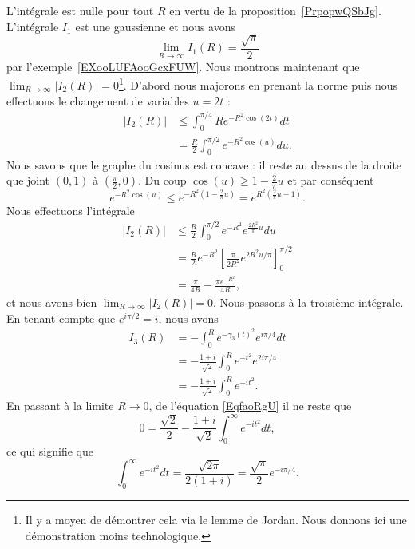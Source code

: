 L'intégrale est nulle pour tout \( R\) en vertu de la proposition~\ref{PrpopwQSbJg}. L'intégrale \( I_1\) est une gaussienne et nous avons
\begin{equation}
	\lim_{R\to\infty}I_1(R)=\frac{ \sqrt{\pi} }{ 2 }
\end{equation}
par l'exemple~\ref{EXooLUFAooGcxFUW}. Nous montrons maintenant que \( \lim_{R\to\infty}| I_2(R) |=0\)\footnote{Il y a moyen de démontrer cela via le lemme de Jordan\cite{FresnelDavidS}. Nous donnons ici une démonstration moins technologique.}. D'abord nous majorons en prenant la norme puis nous effectuons le changement de variables \( u=2t\) :
\begin{subequations}
	\begin{align}
		| I_2(R) | & \leq \int_{0}^{\pi/4}R e^{-R^2\cos(2t)}dt         \\
		           & =\frac{ R }{ 2 }\int_0^{\pi/2} e^{-R^2\cos(u)}du.
	\end{align}
\end{subequations}
Nous savons que le graphe du cosinus est concave : il reste au dessus de la droite que joint \( (0,1)\) à \( (\frac{ \pi }{2},0)\). Du coup \( \cos(u)\geq 1-\frac{ 2 }{ \pi }u\) et par conséquent
\begin{equation}
	e^{-R^2\cos(u)}\leq  e^{-R^2(1-\frac{ 2 }{ \pi }u)}= e^{R^2(\frac{ 2 }{ \pi }u-1)}.
\end{equation}
Nous effectuons l'intégrale
\begin{subequations}
	\begin{align}
		| I_2(R) | & \leq \frac{ R }{2}\int_0^{\pi/2} e^{-R^2} e^{\frac{ 2R^2 }{ \pi }u}du               \\
		           & =\frac{ R }{2} e^{-R^2}\left[ \frac{ \pi }{ 2R^2 } e^{2R^2 u/\pi} \right]_0^{\pi/2} \\
		           & =\frac{ \pi }{ 4R }-\frac{ \pi e^{-R^2} }{ 4R },
	\end{align}
\end{subequations}
et nous avons bien \( \lim_{R\to\infty}| I_2(R) |=0\). Nous passons à la troisième intégrale. En tenant compte que \(  e^{i\pi/2}=i\), nous avons
\begin{subequations}
	\begin{align}
		I_3(R) & =-\int_0^R e^{-\gamma_3(t)^2} e^{i\pi/4}dt              \\
		       & =-\frac{ 1+i }{ \sqrt{2} }\int_0^R e^{-t^2} e^{2i\pi/4} \\
		       & =-\frac{ 1+i }{ \sqrt{2} }\int_0^R e^{-it^2}.
	\end{align}
\end{subequations}
En passant à la limite \( R\to 0 \), de l'équation \eqref{EqfaoRgU} il ne reste que
\begin{equation}
	0=\frac{ \sqrt{2} }{2}-\frac{ 1+i }{ \sqrt{2} }\int_0^{\infty} e^{-it^2}dt,
\end{equation}
ce qui signifie que
\begin{equation}
	\int_0^{\infty} e^{-it^2}dt=\frac{ \sqrt{2\pi} }{ 2(1+i) }=\frac{ \sqrt{\pi} }{2} e^{-i\pi/4}.
\end{equation}


